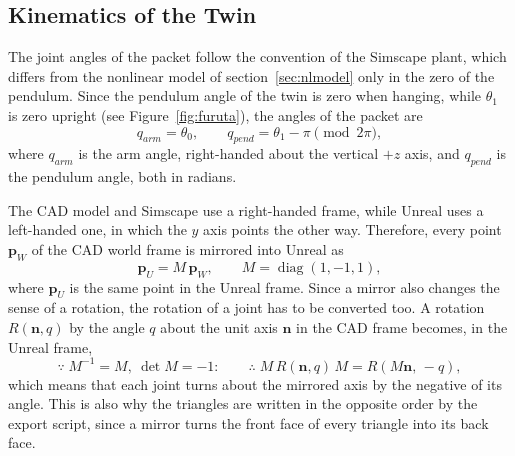 \documentclass[a4paper,11pt]{article}
\begin{document}
\subsection{Kinematics of the Twin}
\label{sec:twin_kinematics}
The joint angles of the packet follow the convention of the Simscape plant, which differs from the nonlinear model of section~\ref{sec:nlmodel} only in the zero of the pendulum. Since the pendulum angle of the twin is zero when hanging, while $\theta_1$ is zero upright (see Figure~\ref{fig:furuta}), the angles of the packet are
\begin{equation}
  q_{arm} = \theta_0, \qquad q_{pend} = \theta_1 - \pi \pmod{2\pi},
  \label{eq:twin_angles}
\end{equation}
where $q_{arm}$ is the arm angle, right-handed about the vertical $+z$ axis, and $q_{pend}$ is the pendulum angle, both in radians.

The CAD model and Simscape use a right-handed frame, while Unreal uses a left-handed one, in which the $y$ axis points the other way. Therefore, every point $\mathbf{p}_W$ of the CAD world frame is mirrored into Unreal as
\begin{equation}
  \mathbf{p}_U = M\, \mathbf{p}_W, \qquad M = \operatorname{diag}(1, -1, 1),
  \label{eq:twin_mirror}
\end{equation}
where $\mathbf{p}_U$ is the same point in the Unreal frame. Since a mirror also changes the sense of a rotation, the rotation of a joint has to be converted too. A rotation $R(\mathbf{n}, q)$ by the angle $q$ about the unit axis $\mathbf{n}$ in the CAD frame becomes, in the Unreal frame,
\begin{equation}
  \because\; M^{-1} = M,\ \det M = -1: \qquad \therefore\; M\, R(\mathbf{n}, q)\, M = R(M\mathbf{n},\, -q),
  \label{eq:twin_rot}
\end{equation}
which means that each joint turns about the mirrored axis by the negative of its angle. This is also why the triangles are written in the opposite order by the export script, since a mirror turns the front face of every triangle into its back face.
\end{document}
